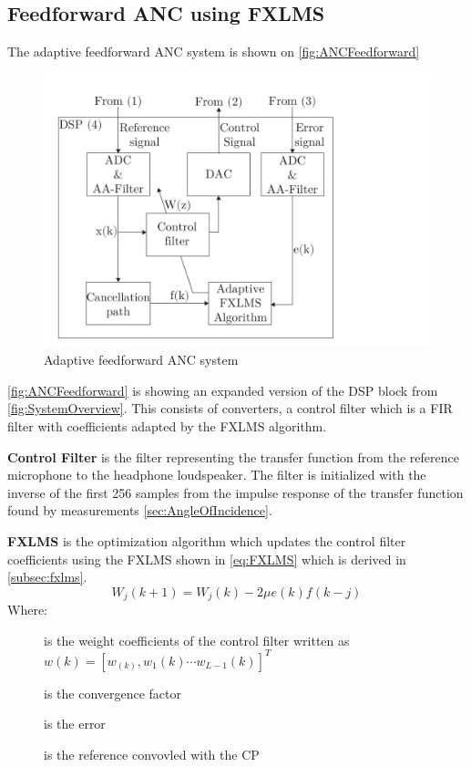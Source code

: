 \subsection*{Feedforward ANC using FXLMS}
The adaptive feedforward ANC system is shown on \autoref{fig:ANCFeedforward}
\begin{figure}[H]
	\centering
	\includegraphics[width=1\columnwidth]{figures/ArticleIllustrations/ANCFeedForward}
	\caption{Adaptive feedforward ANC system}
	\label{fig:ANCFeedforward}
\end{figure}
\autoref{fig:ANCFeedforward} is showing an expanded version of the DSP block from \autoref{fig:SystemOverview}. This consists of converters, a control filter which is a FIR filter with coefficients adapted by the FXLMS algorithm. 

\textbf{Control Filter} is the filter representing the transfer function from the reference microphone to the headphone loudspeaker. The filter is initialized with the inverse of the first 256 samples from the impulse response of the transfer function found by measurements \autoref{sec:AngleOfIncidence}.  

\textbf{FXLMS} is the optimization algorithm which updates the control filter coefficients using the FXLMS shown in \autoref{eq:FXLMS} which is derived in \autoref{subsec:fxlms}. 
\begin{equation}\label{eq:FXLMS}
W_j(k+1) = W_j(k) - 2\mu e(k)f(k-j)
\end{equation}
Where:
\begin{description}
	\item[] is the weight coefficients of the control filter written as  $w(k)=[w_(k),w_1(k) \cdots w_{L-1}(k)]^T$
	\item[\text{$\mu$}] is the convergence factor
	\item[] is the error 
	\item[] is the reference convovled with the CP
\end{description}


